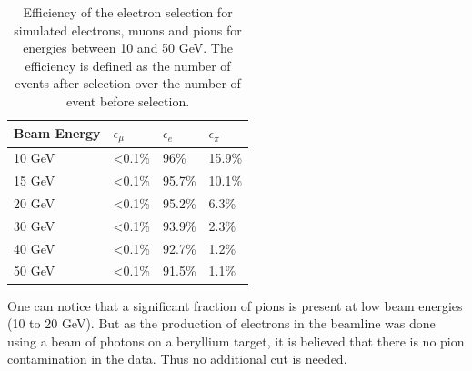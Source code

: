 \begin{table}[htb!]
	\centering
	\caption{Efficiency of the electron selection for simulated electrons, muons and pions for energies between 10 and 50 GeV. The efficiency is defined as the number of events after selection over the number of event before selection.}
	\label{table:eff_electron}
	\begin{tabular}{@{} llll @{}}
		\toprule
		\textbf{Beam Energy} & \textbf{$\epsilon_{\mu}$} & \textbf{$\epsilon_{e}$} & \textbf{$\epsilon_{\pi}$}\\
		\midrule
		10 GeV & <0.1\% & 96\% & 15.9\%\\
		15 GeV & <0.1\% & 95.7\% & 10.1\%\\
		20 GeV & <0.1\% & 95.2\% & 6.3\%\\
		30 GeV & <0.1\% & 93.9\% & 2.3\%\\
		40 GeV & <0.1\% & 92.7\% & 1.2\%\\
		50 GeV & <0.1\% & 91.5\% & 1.1\%\\
		\bottomrule
	\end{tabular}
\end{table}

One can notice that a significant fraction of pions is present at low beam energies (10 to 20 GeV). But as the production of electrons in the beamline was done using a beam of photons on a beryllium target, it is believed that there is no pion contamination in the data. Thus no additional cut is needed.

